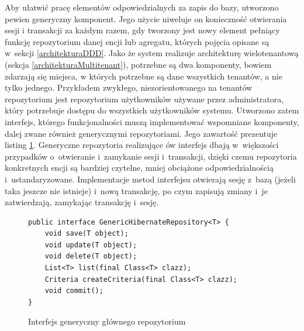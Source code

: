 \documentclass[a4paper]{book}
\begin{document}
{Aby ułatwić pracę elementów odpowiedzialnych za zapis do bazy, utworzono pewien generyczny komponent. Jego użycie niweluje on konieczność otwierania sesji i transakcji za każdym razem, gdy tworzony jest nowy element pełniący funkcję repozytorium danej encji lub agregatu, których pojęcia opisane są w~sekcji \ref{architekturaDDD}. Jako że system realizuje architekturę wielotenantową (sekcja \ref{architekturaMultitenant}), potrzebne są dwa komponenty, bowiem zdarzają się miejsca, w których potrzebne są dane wszystkich tenantów, a nie tylko jednego. Przykładem zwykłego, niezorientowanego na tenantów repozytorium jest repozytorium użytkowników używane przez administratora, który potrzebuje dostępu do wszystkich użytkowników systemu. Utworzono zatem interfejs, którego funkcjonalności muszą implementować wspomniane komponenty, dalej zwane również generycznymi repozytoriami. Jego zawartość prezentuje listing \ref{id:fig:listing:HibernateRepository}. Generyczne repozytoria realizujące ów interfejs dbają w~większości przypadków o~otwieranie i~zamykanie sesji i~transakcji, dzięki czemu repozytoria konkretnych encji są bardziej czytelne, mniej obciążone odpowiedzialnością i~ustandaryzowane. Implementacje metod interfejsu otwierają sesję z~bazą (jeżeli taka jeszcze nie istnieje) i~nową transakcję, po czym zapisują zmiany i~je zatwierdzają, zamykając transakcję i~sesję.
\begin{figure}
\begin{lstlisting}
public interface GenericHibernateRepository<T> {
	void save(T object);
	void update(T object);
	void delete(T object);
	List<T> list(final Class<T> clazz);
	Criteria createCriteria(final Class<T> clazz);
	void commit();
}
\end{lstlisting}
\caption{Interfejs generyczny głównego repozytorium}
\label{id:fig:listing:HibernateRepository}
\end{figure}

}
\end{document}
